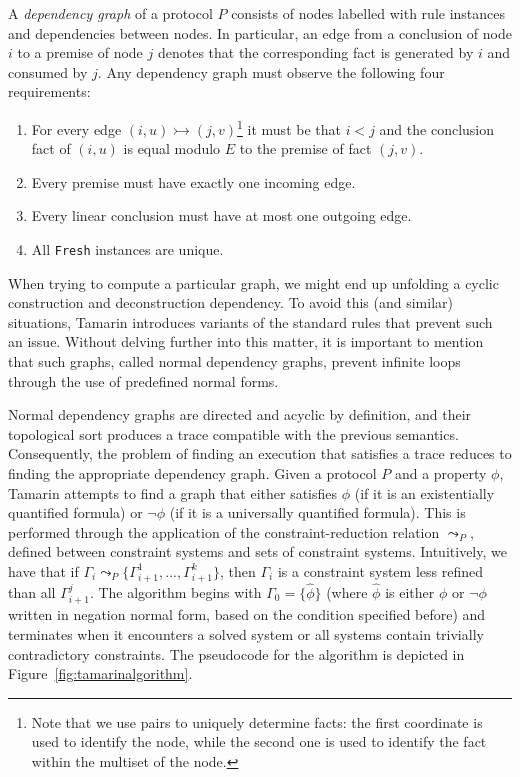 A \textit{dependency graph} of a protocol $P$ consists of nodes labelled with rule instances and dependencies between nodes. In particular, an edge from a conclusion of node $i$ to a premise of node $j$ denotes that the corresponding fact is generated by $i$ and consumed by $j$. Any dependency graph must observe the following four requirements:

\begin{enumerate}
    \item For every edge $(i,u) \rightarrowtail (j,v)$\footnote{Note that we use pairs to uniquely determine facts: the first coordinate is used to identify the node, while the second one is used to identify the fact within the multiset of the node.} it must be that $i<j$ and the conclusion fact of $(i,u)$ is equal modulo $E$ to the premise of fact $(j,v)$.
    \item Every premise must have exactly one incoming edge.
    \item Every linear conclusion must have at most one outgoing edge.
    \item All \texttt{Fresh} instances are unique.
\end{enumerate}

When trying to compute a particular graph, we might end up unfolding a cyclic construction and deconstruction dependency. To avoid this (and similar) situations, Tamarin introduces variants of the standard rules that prevent such an issue. Without delving further into this matter, it is important to mention that such graphs, called normal dependency graphs, prevent infinite loops through the use of predefined normal forms.

Normal dependency graphs are directed and acyclic by definition, and their topological sort produces a trace compatible with the previous semantics. Consequently, the problem of finding an execution that satisfies a trace reduces to finding the appropriate dependency graph. Given a protocol $P$ and a property $\phi$, Tamarin attempts to find a graph that either satisfies $\phi$ (if it is an existentially quantified formula) or $\neg \phi$ (if it is a universally quantified formula). This is performed through the application of the constraint-reduction relation $\leadsto_P$, defined between constraint systems and sets of constraint systems. Intuitively, we have that if $\Gamma_{i} \leadsto_P \{\Gamma_{i+1}^1, ..., \Gamma_{i+1}^k\}$, then $\Gamma_i$ is a constraint system less refined than all $\Gamma_{i+1}^j$. The algorithm begins with $\Gamma_0 = \{ \hat{\phi} \}$ (where $\hat{\phi}$ is either $\phi$ or $\neg \phi$ written in negation normal form, based on the condition specified before) and terminates when it encounters a solved system or all systems contain trivially contradictory constraints. The pseudocode for the algorithm is depicted in Figure~\ref{fig:tamarinalgorithm}.

